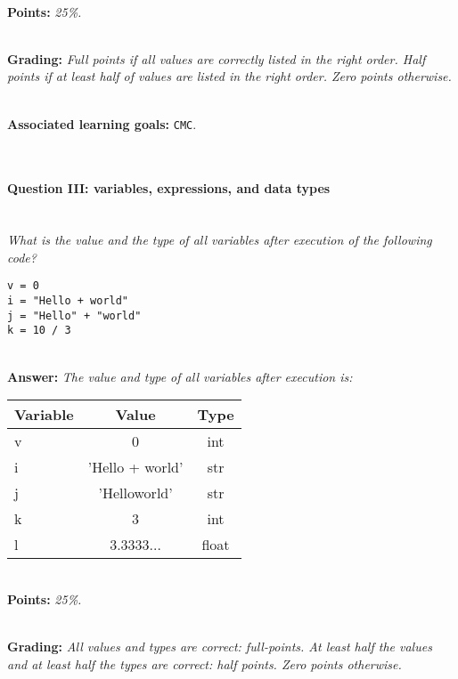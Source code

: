 \ \\

\textbf{Points:} \textit{25\%.}

\ \\ 

\textbf{Grading:} \textit{Full points if all values are correctly listed in the right order. Half points if at least half of values are listed in the right order. Zero points otherwise.}

\ \\ 

\textbf{Associated learning goals:} \texttt{CMC}.

\ \\ 

\paragraph{Question III: variables, expressions, and data types}

\ \\ 

\textit{What is the value and the type of all variables after execution of the following code?}
\begin{lstlisting}
v = 0
i = "Hello + world"
j = "Hello" + "world"
k = 10 / 3
\end{lstlisting}

\ \\ 

\textbf{Answer:} \textit{The value and type of all variables after execution is:}

\begin{tabular}{| l | c | c | }
\hline
\textbf{Variable} & \textbf{Value} & \textbf{Type} \\
\hline
v & 0 & int \\
\hline
i & 'Hello + world' & str \\
\hline
j & 'Helloworld' & str \\
\hline
k & 3 & int \\
\hline
l & 3.3333$\dots$ & float \\
\hline
\end{tabular}

\ \\ 

\textbf{Points:} \textit{25\%.}

\ \\ 

\textbf{Grading:} \textit{All values and types are correct: full-points. At least half the values and at least half the types are correct: half points. Zero points otherwise.}

